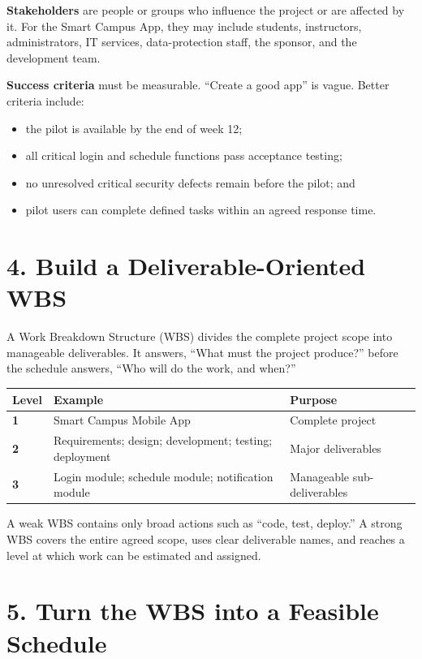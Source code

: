 \documentclass[11pt,a4paper]{article}
\begin{document}
\textbf{Stakeholders} are people or groups who influence the project or are affected by it. For the Smart Campus App, they may include students, instructors, administrators, IT services, data-protection staff, the sponsor, and the development team.

\textbf{Success criteria} must be measurable. ``Create a good app'' is vague. Better criteria include:

\begin{itemize}
  \item the pilot is available by the end of week 12;
  \item all critical login and schedule functions pass acceptance testing;
  \item no unresolved critical security defects remain before the pilot; and
  \item pilot users can complete defined tasks within an agreed response time.
\end{itemize}

\section{4. Build a Deliverable-Oriented WBS}

A Work Breakdown Structure (WBS) divides the complete project scope into manageable deliverables. It answers, ``What must the project produce?'' before the schedule answers, ``Who will do the work, and when?''

\begin{center}
\begin{tabularx}{0.94\textwidth}{>{\bfseries}l X X}
\toprule
Level & Example & Purpose \\
\midrule
1 & Smart Campus Mobile App & Complete project \\
2 & Requirements; design; development; testing; deployment & Major deliverables \\
3 & Login module; schedule module; notification module & Manageable sub-deliverables \\
\bottomrule
\end{tabularx}
\end{center}

A weak WBS contains only broad actions such as ``code, test, deploy.'' A strong WBS covers the entire agreed scope, uses clear deliverable names, and reaches a level at which work can be estimated and assigned.

\section{5. Turn the WBS into a Feasible Schedule}
\end{document}
